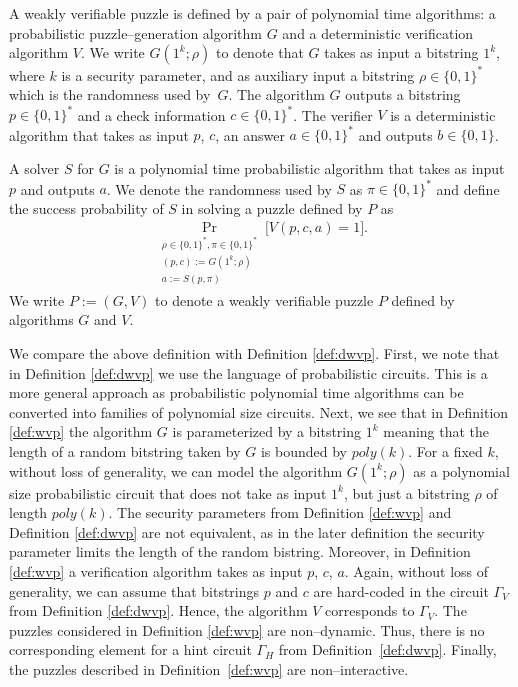 \begin{definition}
  \label{def:wvp}
A \textnormal{weakly verifiable puzzle} is defined by a pair of polynomial time algorithms:
a probabilistic puzzle--generation algorithm $G$ and a deterministic verification algorithm $V$.
We write $G(1^k; \rho)$ to denote that $G$ takes as input a bitstring $1^k$, where $k$ is a security parameter,
and as auxiliary input a bitstring $\rho \in \{0,1\}^{*}$ which is the randomness used by~$G$.
The algorithm $G$ outputs a bitstring $p \in \{0,1\}^{*}$ and a check information $c \in \{0,1\}^{*}$.
The \textnormal{verifier} $V$ is a deterministic algorithm that takes as input $p$, $c$, an answer $a \in \{0,1\}^{*}$
and outputs $b \in \{0,1\}$.

A \textnormal{solver} $S$ for $G$ is a polynomial time probabilistic algorithm that
takes as input $p$ and outputs $a$. We denote the randomness used by $S$ as $\pi \in \{0,1\}^{*}$
and define the \textnormal{success probability} of $S$ in solving a puzzle defined by $P$ as
\begin{align*}
  \underset{\substack{\rho \in \{0,1\}^{*}, \pi \in \{0,1\}^{*} \\ (p,c):=G(1^k; \rho) \\ a := S(p, \pi)}}{\Pr}\Big[ V(p,c,a) = 1\Big].
\end{align*}
We write $P := (G,V)$ to denote a weakly verifiable puzzle $P$ defined by algorithms $G$ and $V$.
\end{definition}
We compare the above definition with Definition \ref{def:dwvp}.
First, we note that in Definition \ref{def:dwvp} we use the language of probabilistic circuits. This is a more general approach
as probabilistic polynomial time algorithms can be converted into families of polynomial size circuits.
Next, we see that in Definition \ref{def:wvp} the algorithm $G$ is parameterized by
a bitstring $1^k$ meaning that the length of a random bitstring taken by $G$ is bounded by $poly(k)$.
For a fixed $k$, without loss of generality, we can model the algorithm $G(1^k; \rho)$ as a polynomial size probabilistic circuit
that does not take as input $1^k$, but just a bitstring $\rho$ of length $\mathit{poly}(k)$.
The security parameters from Definition \ref{def:wvp} and Definition \ref{def:dwvp} are not equivalent,
as in the later definition the security parameter limits the length of the random bistring.
Moreover, in Definition \ref{def:wvp} a verification algorithm takes as input $p$, $c$, $a$.
Again, without loss of generality, we can assume that bitstrings $p$ and $c$ are hard-coded
in the circuit $\Gamma_V$ from Definition \ref{def:dwvp}. Hence, the algorithm $V$ corresponds to $\Gamma_V$.
The puzzles considered in Definition \ref{def:wvp} are non--dynamic. Thus, there is no corresponding
element for a hint circuit $\Gamma_H$ from Definition~\ref{def:dwvp}.
Finally, the puzzles described in Definition~\ref{def:wvp} are non--interactive.

